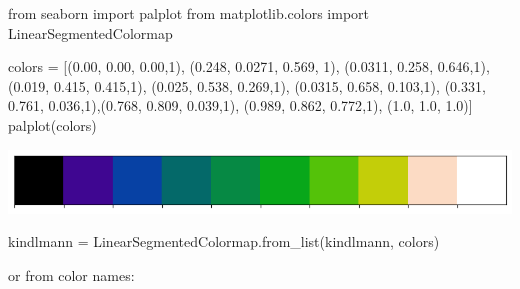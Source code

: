 \documentclass[
  letterpaper,
  DIV=11,
  numbers=noendperiod]{scrreprt}
\newenvironment{Shaded}{\begin{snugshade}}{\end{snugshade}}
\newcommand{\DecValTok}[1]{\textcolor[rgb]{0.68,0.00,0.00}{#1}}
\newcommand{\FloatTok}[1]{\textcolor[rgb]{0.68,0.00,0.00}{#1}}
\newcommand{\ImportTok}[1]{\textcolor[rgb]{0.00,0.46,0.62}{#1}}
\newcommand{\NormalTok}[1]{\textcolor[rgb]{0.00,0.23,0.31}{#1}}
\newcommand{\OperatorTok}[1]{\textcolor[rgb]{0.37,0.37,0.37}{#1}}
\newcommand{\StringTok}[1]{\textcolor[rgb]{0.13,0.47,0.30}{#1}}
\begin{document}
\begin{Shaded}
\begin{Highlighting}[]
\ImportTok{from}\NormalTok{ seaborn }\ImportTok{import}\NormalTok{ palplot}
\ImportTok{from}\NormalTok{ matplotlib.colors }\ImportTok{import}\NormalTok{ LinearSegmentedColormap}

\NormalTok{colors }\OperatorTok{=}\NormalTok{ [(}\FloatTok{0.00}\NormalTok{, }\FloatTok{0.00}\NormalTok{, }\FloatTok{0.00}\NormalTok{,}\DecValTok{1}\NormalTok{), (}\FloatTok{0.248}\NormalTok{, }\FloatTok{0.0271}\NormalTok{, }\FloatTok{0.569}\NormalTok{, }\DecValTok{1}\NormalTok{), (}\FloatTok{0.0311}\NormalTok{, }\FloatTok{0.258}\NormalTok{, }\FloatTok{0.646}\NormalTok{,}\DecValTok{1}\NormalTok{),}
\NormalTok{            (}\FloatTok{0.019}\NormalTok{, }\FloatTok{0.415}\NormalTok{, }\FloatTok{0.415}\NormalTok{,}\DecValTok{1}\NormalTok{), (}\FloatTok{0.025}\NormalTok{, }\FloatTok{0.538}\NormalTok{, }\FloatTok{0.269}\NormalTok{,}\DecValTok{1}\NormalTok{), (}\FloatTok{0.0315}\NormalTok{, }\FloatTok{0.658}\NormalTok{, }\FloatTok{0.103}\NormalTok{,}\DecValTok{1}\NormalTok{),}
\NormalTok{            (}\FloatTok{0.331}\NormalTok{, }\FloatTok{0.761}\NormalTok{, }\FloatTok{0.036}\NormalTok{,}\DecValTok{1}\NormalTok{),(}\FloatTok{0.768}\NormalTok{, }\FloatTok{0.809}\NormalTok{, }\FloatTok{0.039}\NormalTok{,}\DecValTok{1}\NormalTok{), (}\FloatTok{0.989}\NormalTok{, }\FloatTok{0.862}\NormalTok{, }\FloatTok{0.772}\NormalTok{,}\DecValTok{1}\NormalTok{),}
\NormalTok{            (}\FloatTok{1.0}\NormalTok{, }\FloatTok{1.0}\NormalTok{, }\FloatTok{1.0}\NormalTok{)]}
\NormalTok{palplot(colors)}
\end{Highlighting}
\end{Shaded}

\includegraphics{labs/w02_maps_files/figure-pdf/cell-29-output-1.png}

\begin{Shaded}
\begin{Highlighting}[]
\NormalTok{kindlmann }\OperatorTok{=}\NormalTok{ LinearSegmentedColormap.from\_list(}\StringTok{\textquotesingle{}kindlmann\textquotesingle{}}\NormalTok{, colors)}
\end{Highlighting}
\end{Shaded}

or from color names:
\end{document}
